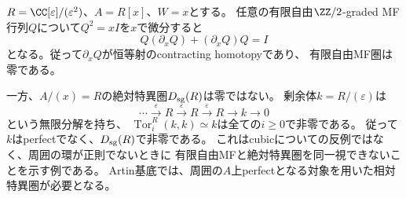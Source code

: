 \begin{example}[Artin基底で絶対特異圏を使えない例]
\label{cg:ex:artin-singularity}
$R=\CC[\varepsilon]/(\varepsilon^2)$、$A=R[x]$、$W=x$とする。
任意の有限自由$\ZZ/2$-graded MF行列$Q$について$Q^2=xI$を$x$で微分すると
\[
 Q(\partial_xQ)+(\partial_xQ)Q=I
\]
となる。従って$\partial_xQ$が恒等射のcontracting homotopyであり、
有限自由MF圏は零である。

一方、$A/(x)=R$の絶対特異圏$D_{\rm sg}(R)$は零ではない。
剰余体$k=R/(\varepsilon)$は
\[
 \cdots\xrightarrow{\varepsilon}R
 \xrightarrow{\varepsilon}R
 \xrightarrow{\varepsilon}R\longrightarrow k\longrightarrow0
\]
という無限分解を持ち、
$\operatorname{Tor}^R_i(k,k)\simeq k$は全ての$i\ge0$で非零である。
従って$k$はperfectでなく、$D_{\rm sg}(R)$で非零である。
これはcubicについての反例ではなく、周囲の環が正則でないときに
有限自由MFと絶対特異圏を同一視できないことを示す例である。
Artin基底では、周囲の$A$上perfectとなる対象を用いた相対特異圏が必要となる。
\end{example}
